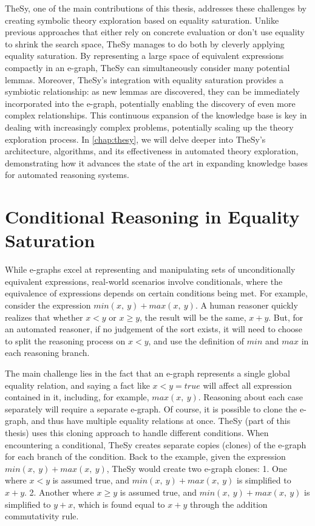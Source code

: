 TheSy, one of the main contributions of this thesis, addresses these challenges by creating symbolic theory exploration based on equality saturation.
Unlike previous approaches that either rely on concrete evaluation or don't use equality to shrink the search space, TheSy manages to do both by cleverly applying equality saturation.
By representing a large space of equivalent expressions compactly in an e-graph, TheSy can simultaneously consider many potential lemmas. 
Moreover, TheSy's integration with equality saturation provides a symbiotic relationship: as new lemmas are discovered, they can be immediately incorporated into the e-graph, potentially enabling the discovery of even more complex relationships. 
This continuous expansion of the knowledge base is key in dealing with increasingly complex problems, potentially scaling up the theory exploration process.
In \autoref{chap:thesy}, we will delve deeper into TheSy's architecture, algorithms, and its effectiveness in automated theory exploration, demonstrating how it advances the state of the art in expanding knowledge bases for automated reasoning systems.


\section{Conditional Reasoning in Equality Saturation}

While e-graphs excel at representing and manipulating sets of unconditionally equivalent expressions,
real-world scenarios involve conditionals, where the equivalence of expressions depends on certain conditions being met. 
For example, consider the expression $min(x,~y) + max(x,~y)$.
A human reasoner quickly realizes that whether $x < y$ or $x \geq y$, the result will be the same, $x + y$.
But, for an automated reasoner, if no judgement of the sort exists, it will need to choose to split the reasoning process on $x < y$, and use the definition of $min$ and $max$ in each reasoning branch.

The main challenge lies in the fact that an e-graph represents a single global equality relation, and saying a fact like $x < y = true$ will affect all expression contained in it, including, for example, $max(x,~y)$.
Reasoning about each case separately will require a separate e-graph.
Of course, it is possible to clone the e-graph,
and thus have multiple equality relations at once.
TheSy \cite{thesy} (part of this thesis) uses this cloning approach to handle different conditions. 
When encountering a conditional, TheSy creates separate copies (clones) of the e-graph for each branch of the condition.
Back to the example, given the expression $min(x,~y) + max(x,~y)$, TheSy would create two e-graph clones:
1. One where $x < y$ is assumed true, and $min(x,~y) + max(x,~y)$ is simplified to $x + y$.
2. Another where $x \geq y$ is assumed true, and $min(x,~y) + max(x,~y)$ is simplified to $y + x$, which is found equal to $x + y$ through the addition commutativity rule.

